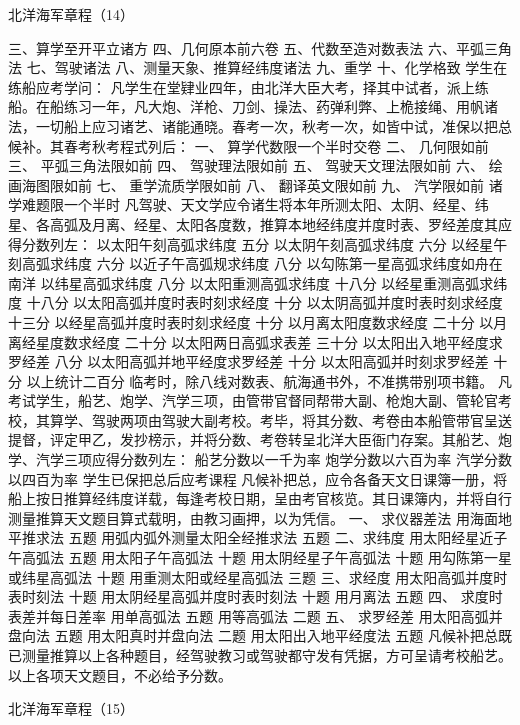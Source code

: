 \documentclass[12pt,UTF8]{ctexbook}
\begin{document}
北洋海军章程（14）

三、算学至开平立诸方
四、几何原本前六卷
五、代数至造对数表法
六、平弧三角法
七、驾驶诸法
八、测量天象、推算经纬度诸法
九、重学
十、化学格致
学生在练船应考学问：
凡学生在堂肄业四年，由北洋大臣大考，择其中试者，派上练船。在船练习一年，凡大炮、洋枪、刀剑、操法、药弹利弊、上桅接绳、用帆诸法，一切船上应习诸艺、诸能通晓。春考一次，秋考一次，如皆中试，准保以把总候补。其春考秋考程式列后：
一、 算学代数限一个半时交卷
二、 几何限如前
三、 平弧三角法限如前
四、 驾驶理法限如前
五、 驾驶天文理法限如前
六、 绘画海图限如前
七、 重学流质学限如前
八、 翻译英文限如前
九、 汽学限如前
诸学难题限一个半时
凡驾驶、天文学应令诸生将本年所测太阳、太阴、经星、纬星、各高弧及月离、经星、太阳各度数，推算本地经纬度并度时表、罗经差度其应得分数列左：
以太阳午刻高弧求纬度 五分
以太阴午刻高弧求纬度 六分
以经星午刻高弧求纬度 六分
以近子午高弧规求纬度 八分
以勾陈第一星高弧求纬度如舟在南洋
以纬星高弧求纬度 八分
以太阳重测高弧求纬度 十八分
以经星重测高弧求纬度 十八分
以太阳高弧并度时表时刻求经度 十分
以太阴高弧并度时表时刻求经度 十三分
以经星高弧并度时表时刻求经度 十分
以月离太阳度数求经度 二十分
以月离经星度数求经度 二十分
以太阳两日高弧求表差 三十分
以太阳出入地平经度求罗经差 八分
以太阳高弧并地平经度求罗经差 十分
以太阳高弧并时刻求罗经差 十分
以上统计二百分 临考时，除八线对数表、航海通书外，不准携带别项书籍。
凡考试学生，船艺、炮学、汽学三项，由管带官督同帮带大副、枪炮大副、管轮官考校，其算学、驾驶两项由驾驶大副考校。考毕，将其分数、考卷由本船管带官呈送提督，评定甲乙，发抄榜示，并将分数、考卷转呈北洋大臣衙门存案。其船艺、炮学、汽学三项应得分数列左：
船艺分数以一千为率
炮学分数以六百为率
汽学分数以四百为率
学生已保把总后应考课程
凡候补把总，应令各备天文日课簿一册，将船上按日推算经纬度详载，每逢考校日期，呈由考官核览。其日课簿内，并将自行测量推算天文题目算式载明，由教习画押，以为凭信。
一、 求仪器差法
用海面地平推求法 五题
用弧内弧外测量太阳全经推求法 五题
二、求纬度
用太阳经星近子午高弧法 五题
用太阳子午高弧法 十题
用太阴经星子午高弧法 十题
用勾陈第一星或纬星高弧法 十题
用重测太阳或经星高弧法 三题
三、求经度
用太阳高弧并度时表时刻法 十题
用太阴经星高弧并度时表时刻法 十题
用月离法 五题
四、 求度时表差并每日差率
用单高弧法 五题
用等高弧法 二题
五、 求罗经差
用太阳高弧并盘向法 五题
用太阳真时并盘向法 二题
用太阳出入地平经度法 五题
凡候补把总既已测量推算以上各种题目，经驾驶教习或驾驶都守发有凭据，方可呈请考校船艺。以上各项天文题目，不必给予分数。




北洋海军章程（15）
\end{document}
